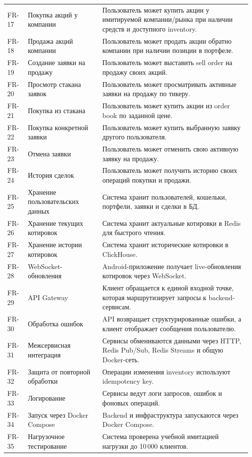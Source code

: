 \documentclass[12pt,a4paper]{article}
\begin{document}
{\begin{longtable}{p{1.2cm}p{3cm}p{9.5cm}}
FR-17  & Покупка акций у компании  & Пользователь может купить акции у имитируемой компании/рынка при наличии средств и доступного inventory. \\
FR-18  & Продажа акций компании    & Пользователь может продать акции обратно компании при наличии позиции в портфеле. \\
FR-19  & Создание заявки на продажу & Пользователь может выставить sell order на продажу своих акций. \\
FR-20  & Просмотр стакана заявок   & Пользователь может просматривать активные заявки на продажу по тикеру. \\
FR-21  & Покупка из стакана        & Пользователь может купить акции из order book по заданной цене. \\
FR-22  & Покупка конкретной заявки  & Пользователь может купить выбранную заявку другого пользователя. \\
FR-23  & Отмена заявки             & Пользователь может отменить свою активную заявку на продажу. \\
FR-24  & История сделок            & Пользователь может получить историю своих операций покупки и продажи. \\
FR-25  & Хранение пользовательских данных & Система хранит пользователей, кошельки, портфели, заявки и сделки в БД. \\
FR-26  & Хранение текущих котировок & Система хранит актуальные котировки в Redis для быстрого чтения. \\
FR-27  & Хранение истории котировок & Система хранит исторические котировки в ClickHouse. \\
FR-28  & WebSocket-обновления       & Android-приложение получает live-обновления котировок через WebSocket. \\
FR-29  & API Gateway               & Клиент обращается к единой входной точке, которая маршрутизирует запросы к backend-сервисам. \\
FR-30  & Обработка ошибок           & API возвращает структурированные ошибки, а клиент отображает сообщения пользователю. \\
FR-31  & Межсервисная интеграция    & Сервисы обмениваются данными через HTTP, Redis Pub/Sub, Redis Streams и общую Docker-сеть. \\
FR-32  & Защита от повторной обработки & Операции изменения inventory используют idempotency key. \\
FR-33  & Логирование                & Сервисы ведут логи запросов, ошибок и фоновых операций. \\
FR-34  & Запуск через Docker Compose & Backend и инфраструктура запускаются через Docker Compose. \\
FR-35  & Нагрузочное тестирование   & Система проверена учебной имитацией нагрузки до 10\,000 клиентов. \\
\bottomrule
\end{longtable}
}
\end{document}
